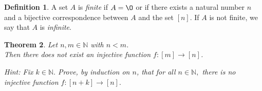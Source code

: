 \documentclass[11pt]{article}
\renewcommand{\emptyset}{\O}
\newtheorem{theorem}{Theorem}[section]
\theoremstyle{definition}
\newtheorem{definition}[theorem]{Definition}
\numberwithin{equation}{subsection}
\begin{document}
\begin{definition}  
A set $A$ is \emph{finite} if $A=\emptyset$ or if there exists a natural number $n$ and a bijective correspondence between $A$ and the set $[n].$   If $A$ is not finite, we say that $A$ is \emph{infinite}.
\end{definition}




\begin{theorem}

Let $n, m\in {\mathbb N}$ with $n<m$.  \\ Then there does not exist an injective function
$f:[m]\rightarrow [n]$.
\end{theorem}
{\it Hint: Fix $k\in\mathbb N.$ Prove, by induction on $n$, that for all $n\in\mathbb{N},$ there is no injective function $f:[n+k]\rightarrow [n].$} 
\end{document}
